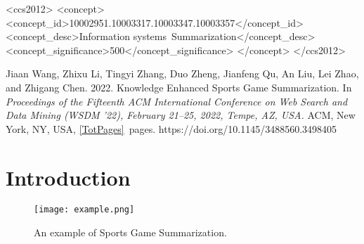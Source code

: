 \begin{CCSXML}
<ccs2012>
<concept>
<concept_id>10002951.10003317.10003347.10003357</concept_id>
<concept_desc>Information systems~Summarization</concept_desc>
<concept_significance>500</concept_significance>
</concept>
</ccs2012>
\end{CCSXML}



\maketitle

{%
  \medskip\small{}\par\nobreak
  \noindent\bgroup\def\\{\unskip{}, \ignorespaces}{Jiaan Wang, Zhixu Li, Tingyi Zhang, Duo Zheng, Jianfeng Qu, An Liu, Lei Zhao, and Zhigang Chen}\egroup. 2022. Knowledge Enhanced Sports Game Summarization. In \textit{Proceedings of the Fifteenth ACM International Conference on Web Search and Data Mining (WSDM '22), February 21--25, 2022, Tempe, AZ, USA}\textit{.} ACM, New York, NY, USA, \ref{TotPages}~pages. https://doi.org/10.1145/3488560.3498405
  }

\section{Introduction}

\begin{figure}[t]
\setlength{\belowcaptionskip}{-12pt}
\centerline{\texttt{[image: example.png]}}
\caption{An example of Sports Game Summarization.}
\label{example}
\end{figure} 

